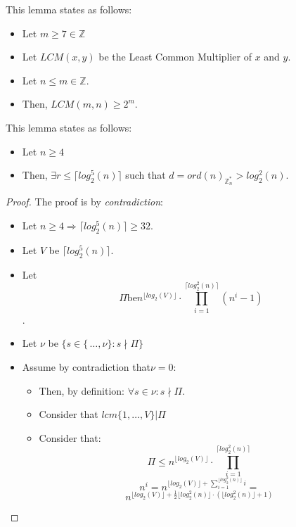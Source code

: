 \begin{lemma}\label{nair_lemma}
    This lemma states as follows:
    \begin{itemize}
        \item Let $m \geq 7 \in \mathbb{Z}$
        \item Let $LCM(x,y)$ be the Least Common Multiplier of $x$ and $y$.
        \item Let $n \leq m \in \mathbb{Z}$.
        \item Then, $LCM(m,n) \geq 2^{m}$.
    \end{itemize}
\end{lemma}

\begin{lemma}\label{aks_lemma}
    This lemma states as follows:
    \begin{itemize}
        \item Let $n \geq 4$
        \item Then, $\exists r \leq \lceil log_{2}^{5}(n) \rceil$ such that $d = ord(n)_{\mathbb{Z}_n^*} > log_2^2(n)$.
    \end{itemize}
\end{lemma}
\begin{proof}
    The proof is by \emph{contradiction}:
    \begin{itemize}
        \item Let $n \geq 4 \Rightarrow \lceil log_{2}^{5}(n) \rceil \geq 32$.
        \item Let $V$ be $\lceil log_{2}^{5}(n) \rceil$.
        \item Let \[\Pi \text{be} n^{\lfloor log_{2}(V) \rfloor} \cdot \prod_{i=1}^{\lceil log_{2}^{2}(n) \rceil}(n^{i} - 1) \].
        \item Let $\nu$ be $\{s \in \{\, \dots, \nu\}: s \nmid \Pi\}$
        \item Assume by contradiction that$ \nu = 0 $:
        \begin{itemize}
            \item Then, by definition: $\forall s \in \nu: s \nmid \Pi$.
            \item Consider that $lcm\{1, \dots, V\} | \Pi$
            \item Consider that:
            \[\Pi \leq n^{\lfloor log_{2}(V) \rfloor} \cdot \prod_{i=1}^{\lceil log_{2}^{2}(n) \rceil}\] \newline
            \[n^{i} =  n^{\lfloor log_{2}(V) \rfloor + \sum_{i=1}^{\lfloor log_{2}^{2}(n) \rfloor} i} = \] \newline
            \[ n^{\lfloor log_{2}(V) \rfloor + \frac{1}{2} \lfloor log_{2}^{2}(n) \rfloor \cdot (\lfloor log_{2}^{2}(n) \rfloor + 1)}\]
        \end{itemize}

    \end{itemize}
\end{proof}
